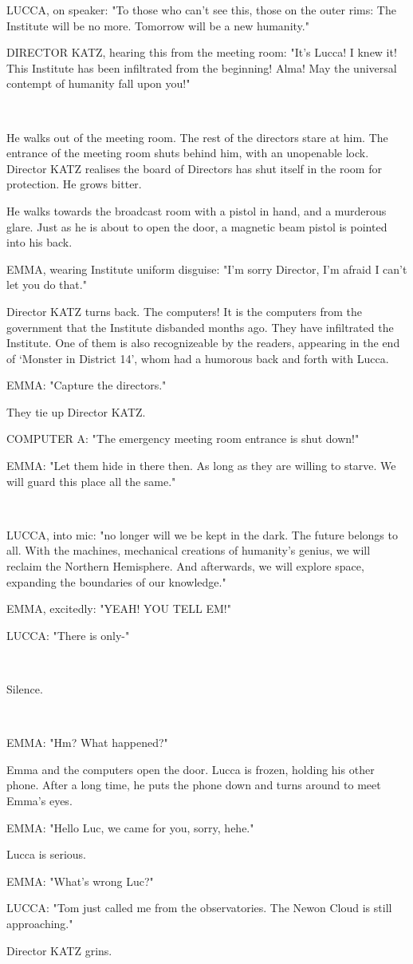 \documentclass[11pt]{article}
\begin{document}
LUCCA, on speaker: "To those who can't see this, those on the outer rims: 
The Institute will be no more.
Tomorrow will be a new humanity."

DIRECTOR KATZ, hearing this from the meeting room: "It's Lucca! 
I knew it! 
This Institute has been infiltrated from the beginning!
Alma! 
May the universal contempt of humanity fall upon you!"

\ 

He walks out of the meeting room. 
The rest of the directors stare at him.
The entrance of the meeting room shuts behind him, with an unopenable lock. 
Director KATZ realises the board of Directors has shut itself in the room for protection. He grows bitter.

He walks towards the broadcast room with a pistol in hand, and a murderous glare. 
Just as he is about to open the door, a magnetic beam pistol is pointed into his back.

EMMA, wearing Institute uniform disguise: "I'm sorry Director, I'm afraid I can't let you do that."

Director KATZ turns back. 
The computers!
It is the computers from the government that the Institute disbanded months ago. 
They have infiltrated the Institute. 
One of them is also recognizeable by the readers, appearing in the end of `Monster in District 14', whom had a humorous back and forth with Lucca.

EMMA: "Capture the directors."

They tie up Director KATZ.

COMPUTER A: "The emergency meeting room entrance is shut down!"

EMMA: "Let them hide in there then. 
As long as they are willing to starve.
We will guard this place all the same."

\ 

LUCCA, into mic: "no longer will we be kept in the dark.
The future belongs to all.
With the machines, mechanical creations of humanity's genius, we will reclaim the Northern Hemisphere.
And afterwards, we will explore space, expanding the boundaries of our knowledge."

EMMA, excitedly: "YEAH! YOU TELL EM!"

LUCCA: "There is only-"

\ 

Silence.

\ 

EMMA: "Hm? What happened?"

Emma and the computers open the door.
Lucca is frozen, holding his other phone.
After a long time, he puts the phone down and turns around to meet Emma's eyes.

EMMA: "Hello Luc, we came for you, sorry, hehe."

Lucca is serious.

EMMA: "What's wrong Luc?"

LUCCA: "Tom just called me from the observatories. 
The Newon Cloud is still approaching."

Director KATZ grins.
\end{document}
